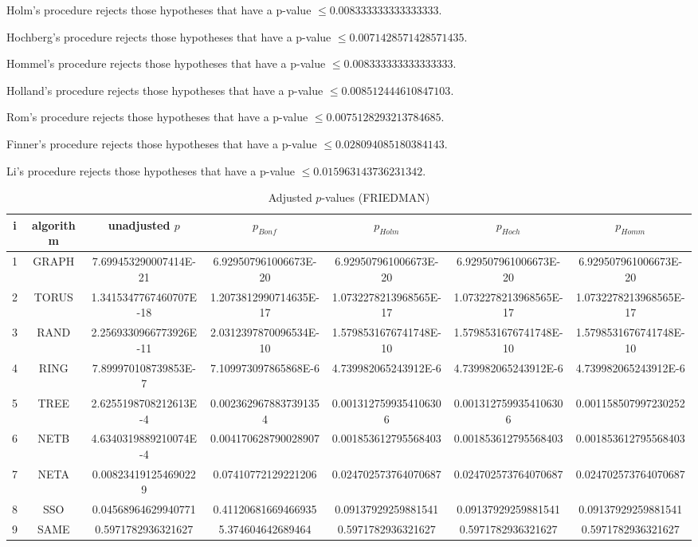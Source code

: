 \documentclass[a4paper,10pt]{article}
\begin{document}
\begin{landscape}
Holm's procedure rejects those hypotheses that have a p-value $\le0.008333333333333333$.


Hochberg's procedure rejects those hypotheses that have a p-value $\le0.0071428571428571435$.


Hommel's procedure rejects those hypotheses that have a p-value $\le0.008333333333333333$.


Holland's procedure rejects those hypotheses that have a p-value $\le0.008512444610847103$.


Rom's procedure rejects those hypotheses that have a p-value $\le0.0075128293213784685$.


Finner's procedure rejects those hypotheses that have a p-value $\le0.028094085180384143$.


Li's procedure rejects those hypotheses that have a p-value $\le0.015963143736231342$.



\newpage

\begin{table}[!htp]
\centering\scriptsize
\caption{Adjusted $p$-values (FRIEDMAN)}
\begin{tabular}{ccccccc}
i&algorithm&unadjusted $p$&$p_{Bonf}$&$p_{Holm}$&$p_{Hoch}$&$p_{Homm}$\\
\hline
1& GRAPH&7.699453290007414E-21&6.929507961006673E-20&6.929507961006673E-20&6.929507961006673E-20&6.929507961006673E-20\\
2& TORUS&1.3415347767460707E-18&1.2073812990714635E-17&1.0732278213968565E-17&1.0732278213968565E-17&1.0732278213968565E-17\\
3& RAND&2.2569330966773926E-11&2.0312397870096534E-10&1.5798531676741748E-10&1.5798531676741748E-10&1.5798531676741748E-10\\
4& RING&7.899970108739853E-7&7.109973097865868E-6&4.739982065243912E-6&4.739982065243912E-6&4.739982065243912E-6\\
5& TREE&2.6255198708212613E-4&0.0023629678837391354&0.0013127599354106306&0.0013127599354106306&0.001158507997230252\\
6& NETB&4.6340319889210074E-4&0.004170628790028907&0.001853612795568403&0.001853612795568403&0.001853612795568403\\
7& NETA&0.008234191254690229&0.07410772129221206&0.024702573764070687&0.024702573764070687&0.024702573764070687\\
8& SSO&0.04568964629940771&0.41120681669466935&0.09137929259881541&0.09137929259881541&0.09137929259881541\\
9& SAME&0.5971782936321627&5.374604642689464&0.5971782936321627&0.5971782936321627&0.5971782936321627\\
\hline
\end{tabular}
\end{table}


\end{landscape}
\end{document}

